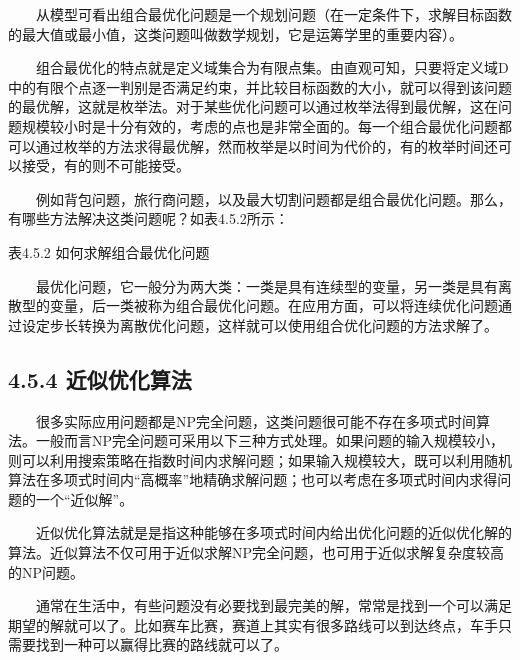 \documentclass[a4paper,11pt,english]{sphinxmanual}
\begin{document}
\sphinxAtStartPar
  从模型可看出组合最优化问题是一个规划问题（在一定条件下，求解目标函数的最大值或最小值，这类问题叫做数学规划，它是运筹学里的重要内容）。

\sphinxAtStartPar
  组合最优化的特点就是定义域集合为有限点集。由直观可知，只要将定义域D中的有限个点逐一判别是否满足约束，并比较目标函数的大小，就可以得到该问题的最优解，这就是枚举法。对于某些优化问题可以通过枚举法得到最优解，这在问题规模较小时是十分有效的，考虑的点也是非常全面的。每一个组合最优化问题都可以通过枚举的方法求得最优解，然而枚举是以时间为代价的，有的枚举时间还可以接受，有的则不可能接受。

\sphinxAtStartPar
  例如背包问题，旅行商问题，以及最大切割问题都是组合最优化问题。那么，有哪些方法解决这类问题呢？如表4.5.2所示：

\begin{center}表4.5.2 如何求解组合最优化问题
\end{center}

\sphinxAtStartPar
  最优化问题，它一般分为两大类：一类是具有连续型的变量，另一类是具有离散型的变量，后一类被称为组合最优化问题。在应用方面，可以将连续优化问题通过设定步长转换为离散优化问题，这样就可以使用组合优化问题的方法求解了。


\subsection{4.5.4 近似优化算法}
\label{\detokenize{rst/4.5QAOA_u7b97_u6cd5:id4}}
\sphinxAtStartPar
  很多实际应用问题都是NP\sphinxhyphen{}完全问题，这类问题很可能不存在多项式时间算法。一般而言NP\sphinxhyphen{}完全问题可采用以下三种方式处理。如果问题的输入规模较小，则可以利用搜索策略在指数时间内求解问题；如果输入规模较大，既可以利用随机算法在多项式时间内“高概率”地精确求解问题；也可以考虑在多项式时间内求得问题的一个“近似解”。

\sphinxAtStartPar
  近似优化算法就是是指这种能够在多项式时间内给出优化问题的近似优化解的算法。近似算法不仅可用于近似求解NP\sphinxhyphen{}完全问题，也可用于近似求解复杂度较高的NP问题。

\sphinxAtStartPar
  通常在生活中，有些问题没有必要找到最完美的解，常常是找到一个可以满足期望的解就可以了。比如赛车比赛，赛道上其实有很多路线可以到达终点，车手只需要找到一种可以赢得比赛的路线就可以了。
\end{document}
